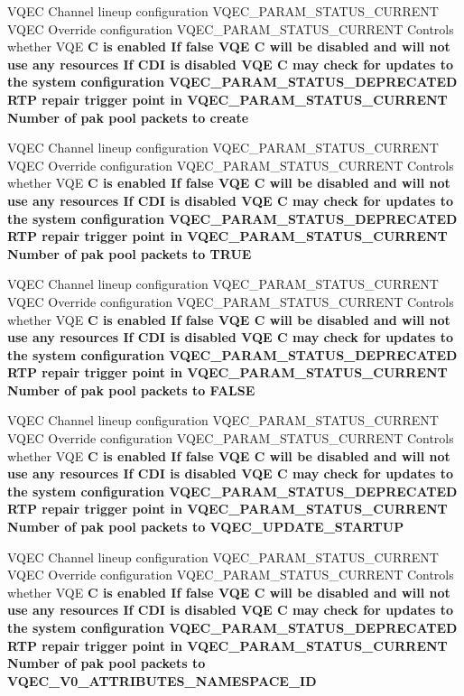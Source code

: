 \begin{CompactItemize}
\item 
VQEC Channel lineup configuration VQEC\_\-PARAM\_\-STATUS\_\-CURRENT VQEC Override configuration VQEC\_\-PARAM\_\-STATUS\_\-CURRENT Controls whether VQE \bf{C} is enabled If false VQE \bf{C} will be disabled and will not use any resources If CDI is disabled VQE \bf{C} may check for updates \bf{to} the system configuration VQEC\_\-PARAM\_\-STATUS\_\-DEPRECATED RTP repair trigger point in VQEC\_\-PARAM\_\-STATUS\_\-CURRENT Number of pak pool packets \bf{to} \bf{create}
\item 
VQEC Channel lineup configuration VQEC\_\-PARAM\_\-STATUS\_\-CURRENT VQEC Override configuration VQEC\_\-PARAM\_\-STATUS\_\-CURRENT Controls whether VQE \bf{C} is enabled If false VQE \bf{C} will be disabled and will not use any resources If CDI is disabled VQE \bf{C} may check for updates \bf{to} the system configuration VQEC\_\-PARAM\_\-STATUS\_\-DEPRECATED RTP repair trigger point in VQEC\_\-PARAM\_\-STATUS\_\-CURRENT Number of pak pool packets \bf{to} \bf{TRUE}
\item 
VQEC Channel lineup configuration VQEC\_\-PARAM\_\-STATUS\_\-CURRENT VQEC Override configuration VQEC\_\-PARAM\_\-STATUS\_\-CURRENT Controls whether VQE \bf{C} is enabled If false VQE \bf{C} will be disabled and will not use any resources If CDI is disabled VQE \bf{C} may check for updates \bf{to} the system configuration VQEC\_\-PARAM\_\-STATUS\_\-DEPRECATED RTP repair trigger point in VQEC\_\-PARAM\_\-STATUS\_\-CURRENT Number of pak pool packets \bf{to} \bf{FALSE}
\item 
VQEC Channel lineup configuration VQEC\_\-PARAM\_\-STATUS\_\-CURRENT VQEC Override configuration VQEC\_\-PARAM\_\-STATUS\_\-CURRENT Controls whether VQE \bf{C} is enabled If false VQE \bf{C} will be disabled and will not use any resources If CDI is disabled VQE \bf{C} may check for updates \bf{to} the system configuration VQEC\_\-PARAM\_\-STATUS\_\-DEPRECATED RTP repair trigger point in VQEC\_\-PARAM\_\-STATUS\_\-CURRENT Number of pak pool packets \bf{to} \bf{VQEC\_\-UPDATE\_\-STARTUP}
\item 
VQEC Channel lineup configuration VQEC\_\-PARAM\_\-STATUS\_\-CURRENT VQEC Override configuration VQEC\_\-PARAM\_\-STATUS\_\-CURRENT Controls whether VQE \bf{C} is enabled If false VQE \bf{C} will be disabled and will not use any resources If CDI is disabled VQE \bf{C} may check for updates \bf{to} the system configuration VQEC\_\-PARAM\_\-STATUS\_\-DEPRECATED RTP repair trigger point in VQEC\_\-PARAM\_\-STATUS\_\-CURRENT Number of pak pool packets \bf{to} \bf{VQEC\_\-V0\_\-ATTRIBUTES\_\-NAMESPACE\_\-ID}

\end{CompactItemize}
